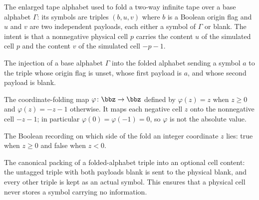 \begin{definition}
\label{Turing.FinTM.FoldSymbol}
\leanok
The enlarged tape alphabet used to fold a two-way infinite tape over a base alphabet
$\Gamma$: its symbols are triples $(b, u, v)$ where $b$ is a Boolean origin flag and
$u$ and $v$ are two independent payloads, each either a symbol of $\Gamma$ or blank.
The intent is that a nonnegative physical cell $p$ carries the content $u$ of the
simulated cell $p$ and the content $v$ of the simulated cell $-p-1$.
\end{definition}

\begin{definition}
\label{Turing.FinTM.foldEmbedding}
\leanok
{}
The injection of a base alphabet $\Gamma$ into the folded alphabet sending a symbol
$a$ to the triple whose origin flag is unset, whose first payload is $a$, and whose
second payload is blank.
\end{definition}

\begin{definition}
\label{Turing.FinTM.foldPos}
\leanok
The coordinate-folding map $\varphi \colon \bbz \to \bbz$ defined by
$\varphi(z) = z$ when $z \ge 0$ and $\varphi(z) = -z-1$ otherwise.  It maps each
negative cell $z$ onto the nonnegative cell $-z-1$; in particular
$\varphi(0) = \varphi(-1) = 0$, so $\varphi$ is not the absolute value.
\end{definition}

\begin{definition}
\label{Turing.FinTM.foldSide}
\leanok
The Boolean recording on which side of the fold an integer coordinate $z$ lies:
true when $z \ge 0$ and false when $z < 0$.
\end{definition}

\begin{definition}
\label{Turing.FinTM.foldPack}
\leanok
{}
The canonical packing of a folded-alphabet triple into an optional cell content: the
untagged triple with both payloads blank is sent to the physical blank, and every
other triple is kept as an actual symbol.  This ensures that a physical cell never
stores a symbol carrying no information.
\end{definition}

